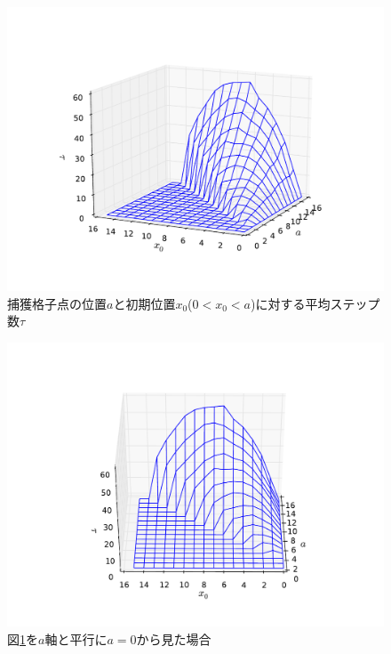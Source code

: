 \documentclass{jsarticle}
\begin{document}
\begin{enumerate}
\begin{enumerate}
                    \begin{figure}[H]
                        \begin{center}
                        \includegraphics[width=14.0cm]{figure_3.pdf}
                        \caption{捕獲格子点の位置$a$と初期位置$x_{0}$($0<x_{0}<a$)に対する平均ステップ数$\tau$}
                        \label{fig:1}
                    \end{center}
                    \end{figure}
                    
                    \begin{figure}[H]
                        \begin{center}
                        \includegraphics[width=12.5cm]{figure_2.pdf}
                        \caption{図\ref{fig:1}を$a$軸と平行に$a=0$から見た場合}
                        \label{fig:2}
                    \end{center}
                    \end{figure}
                    

\end{enumerate}
\end{enumerate}
\end{document}
